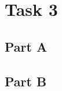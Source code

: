 \documentclass[10pt]{article}
\begin{document}
\section*{Task 3}

\subsection*{Part A}

\subsection*{Part B}



\nocite{*}

\end{document}

